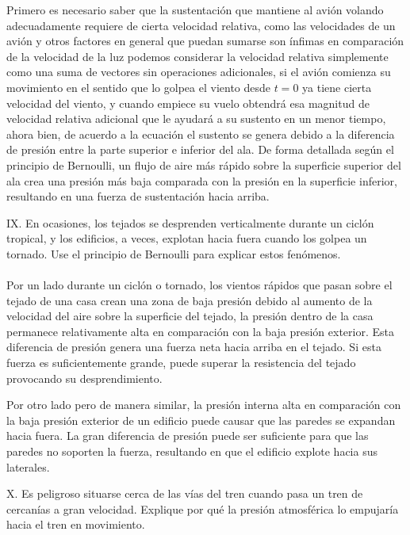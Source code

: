 \documentclass{article}
\begin{document}
Primero es necesario saber que la sustentación que mantiene al avión volando adecuadamente requiere de cierta velocidad relativa, como las velocidades de un avión y otros factores en general que puedan sumarse son ínfimas en comparación de la velocidad de la luz podemos considerar la velocidad relativa simplemente como una suma de vectores sin operaciones adicionales, si el avión comienza su movimiento en el sentido que lo golpea el viento desde $t=0$ ya tiene cierta velocidad del viento, y cuando empiece su vuelo obtendrá esa magnitud de velocidad relativa adicional que le ayudará a su sustento en un menor tiempo,  ahora bien, de acuerdo a la ecuación el sustento se genera debido a la diferencia de presión entre la parte superior e inferior del ala. De forma detallada según el principio de Bernoulli, un flujo de aire más rápido sobre la superficie superior del ala crea una presión más baja comparada con la presión en la superficie inferior, resultando en una fuerza de sustentación hacia arriba.

\noindent IX. En ocasiones, los tejados se desprenden verticalmente durante un ciclón tropical, y los edificios, a veces, explotan hacia fuera cuando los golpea un tornado. Use el principio de Bernoulli para explicar estos fenómenos. \\\\

Por un lado durante un ciclón o tornado, los vientos rápidos que pasan sobre el tejado de una casa crean una zona de baja presión debido al aumento de la velocidad del aire sobre la superficie del tejado, la presión dentro de la casa permanece relativamente alta en comparación con la baja presión exterior. Esta diferencia de presión genera una fuerza neta hacia arriba en el tejado. Si esta fuerza es suficientemente grande, puede superar la resistencia del tejado provocando su desprendimiento.

Por otro lado pero de manera similar, la presión interna alta en comparación con la baja presión exterior de un edificio puede causar que las paredes se expandan hacia fuera. La gran diferencia de presión puede ser suficiente para que las paredes no soporten la fuerza, resultando en que el edificio explote hacia sus laterales.

\noindent X. Es peligroso situarse cerca de las vías del tren cuando pasa un tren de cercanías a gran velocidad. Explique por qué la presión atmosférica lo empujaría hacia el tren en movimiento. \\\\
\end{document}
